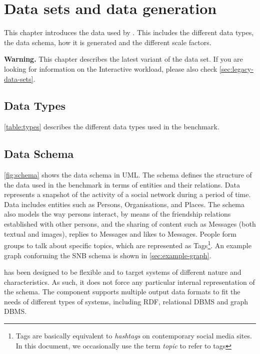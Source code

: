 \chapter{Data sets and data generation}
\label{sec:data}

This chapter introduces the data used by \ldbcsnb. This includes the different
data types, the data schema, how it is generated and the different scale
factors.

\textbf{Warning.} This chapter describes the latest variant of the data set.
If you are looking for information on the Interactive workload, please also check 
\autoref{sec:legacy-data-sets}.

\section{Data Types}
\autoref{table:types} describes the different data types used in the benchmark.



\section{Data Schema}

\autoref{fig:schema} shows the data schema in UML. The schema defines the
structure of the data used in the benchmark in terms of entities and their
relations. Data represents a snapshot of the activity of a social network
during a period of time. Data includes entities such as Persons, Organisations,
and Places. The schema also models the way persons interact, by means of the
friendship relations established with other persons, and the sharing of content
such as Messages (both textual and images), replies to Messages and likes to
Messages.  People form groups to talk about specific topics, which are
represented as Tags\footnote{Tags are basically equivalent to \emph{hashtags}
on contemporary social media sites. In this document, we occasionally use the term
\emph{topic} to refer to tags}. An example graph conforming the SNB schema is shown in \autoref{sec:example-graph}.

\ldbcsnb has been designed to be flexible and to target systems of different
nature and characteristics. As such, it does not force any particular internal
representation of the schema. The \datagen component
supports multiple output data formats to
fit the needs of different types of systems, including RDF, relational DBMS and
graph DBMS.


